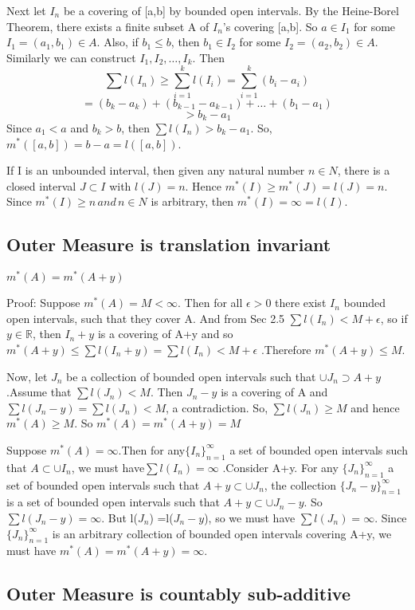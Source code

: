 \documentclass{article}
\begin{document}
Next let ${I_n}$ be a covering of [a,b] by bounded open intervals. By the Heine-Borel Theorem, there exists a finite subset A of $I_n$'s covering [a,b]. So $a \in I_1$ for some $I_1 =(a_1,b_1) \in A$. Also, if $b_1 \leq b$, then $b_1 \in I_2 $ for some $I_2 =(a_2,b_2) \in A$. Similarly we can construct $I_1,I_2,\dots,I_k$. Then
$$ \sum l(I_n) \geq \sum_{i=1}^k l(I_i) = \sum_{i=1}^{k}(b_i - a_i)$$
$$=(b_k-a_k) +(b_{k-1} -a_{k-1})+ \dots + (b_1 - a_1) $$
$$ >b_k -a_1$$
Since $a_1<a$ and $b_k>b$, then $ \sum l(I_n) > b_k -a_1 $. So, $m^*([a,b]) = b-a = l([a,b])$.

If I is an unbounded interval, then given any natural number $n \in N$, there is a closed interval $J \subset I$ with $l(J)=n$. Hence $m^*(I) \geq m^*(J) = l(J)=n$. Since $m^*(I) \geq n \, and \, n \in N$ is arbitrary, then $m^*(I)=\infty=l(I)$. 

\subsection{Outer Measure is translation invariant}
$m^*(A)=m^*(A+y)$

Proof: Suppose $m^*(A) = M < \infty$. Then for all $\epsilon > 0 $ there exist ${I_n}$ bounded open intervals, such that they cover A. And from Sec 2.5 $\sum l(I_n) < M+ \epsilon$, so if $y \in \mathbb{R}$, then ${I_{n}+y}$ is a covering of A+y and so $m^{*}(A+y) \leq \sum l(I_n + y ) = \sum l(I_n) < M + \epsilon$ .Therefore $m^*(A+y) \leq M$.

Now, let ${J_n}$ be a collection of bounded open intervals such that $\cup J_n \supset A+y $.Assume that $\sum l(J_n)< M$. Then ${J_n-y}$ is a covering of A and $\sum l(J_n-y)=\sum l(J_n) < M$, a contradiction. So, $\sum l(J_n) \geq M$ and hence $m^*(A)\geq M$. So $m^*(A)=m^*(A+y)=M$

Suppose $m^*(A)= \infty$.Then for any$\{I_n\}_{n=1}^{\infty} $ a set of bounded open intervals such that $A \subset \cup I_n$, we must
have$\sum l(I_n) =\infty$ .Consider A+y. For any $\{J_n\}_{n=1}^{\infty} $ a set of bounded open intervals such that $A+y \subset \cup J_n$, the collection $\{J_n - y\}_{n=1}^{\infty} $ is a set of bounded open intervals such that $A+y \subset \cup J_n -y$. So $\sum l(J_n - y) =\infty$. But l($J_n$) =l($J_n - y$), so we must have $\sum l(J_n) =\infty$. Since $\{J_n\}_{n=1}^{\infty} $ is an arbitrary collection of bounded open intervals covering A+y, we must have $m^*(A)=m^*(A+y)= \infty$. 

\subsection{Outer Measure is countably sub-additive}
\end{document}
